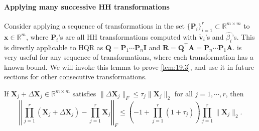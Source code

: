 \documentclass[review,onefignum,onetabnum]{siamart190516}
\newcommand{\R}{\mathbb{R}}
\newcommand{\bb}[1]{\mathbf{#1}}
\begin{document}
\paragraph{Applying many successive HH transformations}
Consider applying a sequence of transformations in the set $\{\bb{P}_{i}\}_{i=1}^r\subset\R^{m\times m}$ to $\bb{x}\in\R^m$, where $\bb{P}_{i}$'s are all HH transformations computed with $\tilde{\bb{v}}_i$'s and $\hat{\beta_i}$'s.
This is directly applicable to HQR as $\bb{Q}=\bb{P}_{1}\cdots\bb{P}_{n}\bb{I}$ and $\bb{R} = \bb{Q}^{\top}\bb{A} = \bb{P}_{n}\cdots\bb{P}_{1}\bb{A}$.
 is very useful for any sequence of transformations, where each transformation has a known bound.
We will invoke this lemma to prove \cref{lem:19.3}, and use it in future sections for other consecutive transformations.
\begin{lemma}\label{lem:3.7}
	If $\bb{X}_{j} + \Delta \bb{X}_{j} \in\R^{m\times m}$ satisfies $\|\Delta \bb{X}_{j}\|_F\leq \tau_j \|\bb{X}_{j}\|_2$ for all $j=1,\cdots,r$, then $$\left|\left|\prod_{j=1}^r (\bb{X}_{j} + \Delta \bb{X}_{j})- \prod_{j=1}^r\bb{X}_{j} \right|\right|_F\leq\left(-1+\prod_{j=1}^r(1+\tau_j)\right)\prod_{j=1}^r\|\bb{X}_{j}\|_2.$$
\end{lemma}
\end{document}

